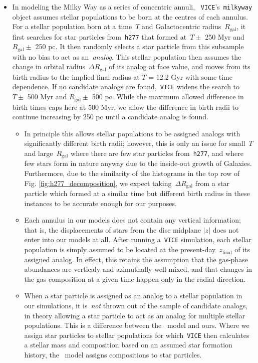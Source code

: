 \documentclass[fleqn, usenatbib]{mnras}
\begin{document}
\begin{itemize}
	\item In modeling the Milky Way as a series of concentric annuli,
	~\texttt{VICE}'s~\texttt{milkyway} object assumes stellar populations to 
	be born at the centres of each annulus. For a stellar population born at a 
	time~$T$ and Galactocentric radius~$R_\text{gal}$, it first searches for 
	star particles from~\texttt{h277} that formed at~$T \pm$ 250 Myr and 
	$R_\text{gal} \pm$ 250 pc. It then randomly selects a star particle from 
	this subsample with no bias to act as an~\textit{analog}. This stellar 
	population then assumes the change in orbital radius~$\Delta R_\text{gal}$ 
	of its analog at face value, and moves from its birth radius to the implied 
	final radius at $T$ = 12.2 Gyr with some time dependence. If no candidate 
	analogs are found,~\texttt{VICE} widens the search to~$T \pm$ 500 Myr and 
	$R_\text{gal} \pm$ 500 pc. While the maximum allowed difference in birth 
	times caps here at 500 Myr, we allow the difference in birth radii to 
	continue increasing by 250 pc until a candidate analog is found. 
	\begin{itemize} 
		\item In principle this allows stellar populations to be assigned 
		analogs with significantly different birth radii; however, this is only 
		an issue for small~$T$ and large~$R_\text{gal}$ where there are few 
		star particles from~\texttt{h277}, and where few stars form in nature 
		anyway due to the inside-out growth of Galaxies. Furthermore, due to 
		the similarity of the histograms in the top row of Fig. 
		\ref{fig:h277_decomposition}, we expect taking~$\Delta R_\text{gal}$ 
		from a star particle which formed at a similar time but different birth 
		radius in these instances to be accurate enough for our purposes. 

		\item Each annulus in our models does not contain any vertical 
		information; that is, the displacements of stars from the disc midplane 
		$\left|z\right|$ does not enter into our models at all. After running 
		a~\texttt{VICE} simulation, each stellar population is simply assumed 
		to be located at the present-day~$z_\text{final}$ of its assigned 
		analog. In effect, this retains the assumption that the gas-phase 
		abundances are verticaly and azimuthally well-mixed, and that changes 
		in the gas composition at a given time happen only in the radial 
		direction.

		\item When a star particle is assigned as an analog to a stellar 
		population in our simulations, it is~\textit{not} thrown out of the 
		sample of candidate analogs, in theory allowing a star particle to act 
		as an analog for multiple stellar populations. This is a difference 
		between the~\citet{Minchev2013} model and ours. Where we assign star 
		particles to stellar populations for which~\texttt{VICE} then 
		calculates a stellar mass and composition based on an assumed star 
		formation history, the~\citet{Minchev2013} model assigns compositions 
		to star particles. 
	\end{itemize} 


\end{itemize}
\end{document}

